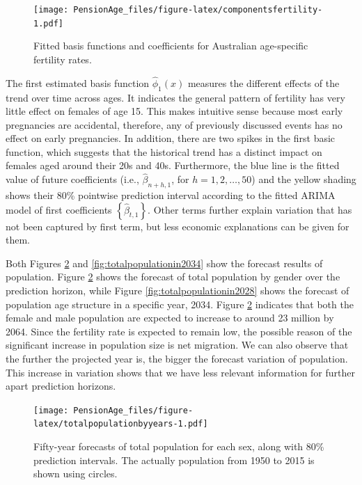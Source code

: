 \documentclass[11pt,a4paper,]{article}
\begin{document}
\begin{figure}
\centering
\texttt{[image: PensionAge\_files/figure-latex/componentsfertility-1.pdf]}
\caption{\label{fig:componentsfertility}Fitted basis functions and coefficients for Australian age-specific fertility rates.}
\end{figure}

The first estimated basis function \(\widehat{\phi}_1(x)\) measures the different effects of the trend over time across ages. It indicates the general pattern of fertility has very little effect on females of age 15. This makes intuitive sense because most early pregnancies are accidental, therefore, any of previously discussed events has no effect on early pregnancies. In addition, there are two spikes in the first basic function, which suggests that the historical trend has a distinct impact on females aged around their 20s and 40s. Furthermore, the blue line is the fitted value of future coefficients (i.e., \(\widehat{\beta}_{n+h,1}\), for \(h=1,2,\dots,50\)) and the yellow shading shows their 80\% pointwise prediction interval according to the fitted ARIMA model of first coefficients \(\left\{\widehat{\beta}_{t,1}\right\}\). Other terms further explain variation that has not been captured by first term, but less economic explanations can be given for them.

Both Figures \ref{fig:totalpopulationbyyears} and \ref{fig:totalpopulationin2034} show the forecast results of population. Figure \ref{fig:totalpopulationbyyears} shows the forecast of total population by gender over the prediction horizon, while Figure \ref{fig:totalpopulationin2028} shows the forecast of population age structure in a specific year, 2034. Figure \ref{fig:totalpopulationbyyears} indicates that both the female and male population are expected to increase to around 23 million by 2064. Since the fertility rate is expected to remain low, the possible reason of the significant increase in population size is net migration. We can also observe that the further the projected year is, the bigger the forecast variation of population. This increase in variation shows that we have less relevant information for further apart prediction horizons.

\begin{figure}
\centering
\texttt{[image: PensionAge\_files/figure-latex/totalpopulationbyyears-1.pdf]}
\caption{\label{fig:totalpopulationbyyears}Fifty-year forecasts of total population for each sex, along with 80\% prediction intervals. The actually population from 1950 to 2015 is shown using circles.}
\end{figure}
\end{document}
